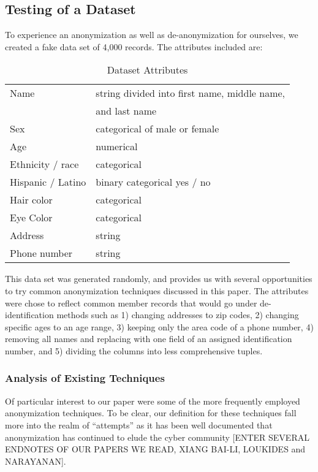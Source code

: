 \documentclass[10pt,journal,compsoc]{IEEEtran}
\begin{document}
\subsection{Testing of a Dataset}
To experience an anonymization as well as de-anonymization for ourselves, we created a fake data set of 4,000 records.  The attributes included are:

\begin{table} [ht]
\caption{Dataset Attributes}
\begin{tabular}{|l|l|}
\hline
Name & string divided into first name, middle name,\\ & and last name\\
\hline
Sex & categorical of male or female\\
\hline
Age & numerical\\
\hline
Ethnicity / race & categorical\\
\hline
Hispanic / Latino & binary categorical yes / no\\
\hline
Hair color & categorical\\
\hline
Eye Color & categorical\\
\hline 
Address & string\\
\hline
Phone number & string\\
\hline

\end{tabular}
\end{table}

This data set was generated randomly, and provides us with several opportunities to try common anonymization techniques discussed in this paper.  The attributes were chose to reflect common member records that would go under de-identification methods such as 1) changing addresses to zip codes, 2) changing specific ages to an age range, 3) keeping only the area code of a phone number, 4) removing all names and replacing with one field of an assigned identification number, and 5) dividing the columns into less comprehensive tuples.


	
\subsubsection{Analysis of Existing Techniques}

	Of particular interest to our paper were some of the more frequently employed anonymization techniques.  To be clear, our definition for these techniques fall more into the realm of “attempts” as it has been well documented that anonymization has continued to elude the cyber community [ENTER SEVERAL ENDNOTES OF OUR PAPERS WE READ, XIANG BAI-LI, LOUKIDES and NARAYANAN].  
	
\end{document}
